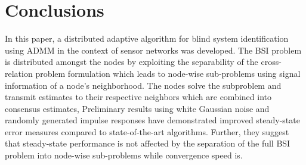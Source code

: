 \documentclass{article}
\begin{document}
\section{Conclusions}
\label{sec:conclusion}
In this paper, a distributed adaptive algorithm for blind system identification using ADMM in the context of sensor networks was developed.
The BSI problem is distributed amongst the nodes by exploiting the separability of the cross-relation problem formulation which leads to node-wise sub-problems using signal information of a node's neighborhood.
The nodes solve the subproblem and transmit estimates to their respective neighbors which are combined into consensus estimates,
Preliminary results using white Gaussian noise and randomly generated impulse responses have demonstrated improved steady-state error measures compared to state-of-the-art algorithms.
Further, they suggest that steady-state performance is not affected by the separation of the full BSI problem into node-wise sub-problems while convergence speed is.



\end{document}
